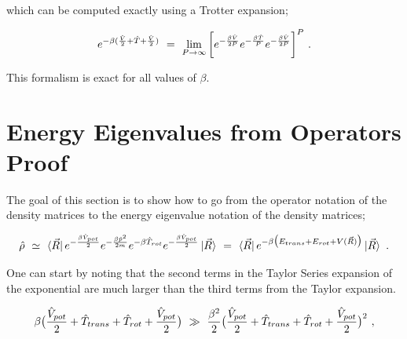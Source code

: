 \documentclass{ece}
\begin{document}
which can be computed exactly using a Trotter expansion;

\begin{equation} \label{eq:10}
e^{-\beta ( \frac{\hat{V}}{2} + \hat{T} + \frac{\hat{V}}{2} )} \hspace{0.125cm} = \hspace{0.125cm} \lim_{P \rightarrow \infty} \bigg[ e^{- \frac{\beta \hat{V}}{2P}} e^{- \frac{\beta \hat{T}}{P}} e^{- \frac{\beta \hat{V}}{2P}} \bigg]^P \hspace{0.125cm} .  
\end{equation}

This formalism is exact for all values of \begin{math} \beta \end{math}.

\section{Energy Eigenvalues from Operators Proof}
\label{app:fthappx}

The goal of this section is to show how to go from the operator notation of the density matrices to the energy eigenvalue notation of the density matrices;

\begin{equation} 
\hat{\rho} \hspace{0.125cm} \simeq \hspace{0.125cm} \bra{\vec{R}} e^{- \frac{ \beta \hat{V}_{pot}}{2}} e^{- \frac{\beta \hat{p}^2}{2 m}} e^{-\beta \hat{T}_{rot}} e^{- \frac{ \beta \hat{V}_{pot}}{2}} \ket{\vec{R}} \hspace{0.125cm} = \hspace{0.125cm} \bra{\vec{R}} e^{ - \beta \big( E_{trans} + E_{rot} + V(\vec{R})\big)} \ket{\vec{R}} \hspace{0.125cm} . 
\end{equation}

One can start by noting that the second terms in the Taylor Series expansion of the exponential are much larger than the third terms from the Taylor expansion.

\begin{equation} \label{eq:40}
\beta \big( \frac{\hat{V}_{pot}}{2} + \hat{T}_{trans} + \hat{T}_{rot} + \frac{\hat{V}_{pot}}{2} \big)  \hspace{0.125cm} \gg \hspace{0.125cm} \frac{\beta^2}{2} \big( \frac{\hat{V}_{pot}}{2} + \hat{T}_{trans} + \hat{T}_{rot} + \frac{\hat{V}_{pot}}{2} \big)^2 \hspace{0.125cm} ,
\end{equation}
\end{document}

